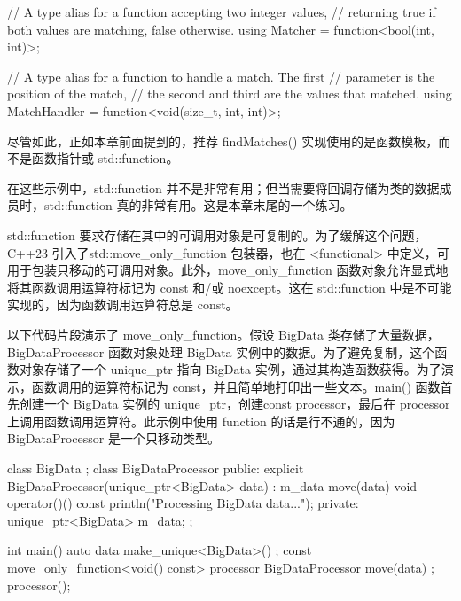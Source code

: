 \begin{cpp}
// A type alias for a function accepting two integer values,
// returning true if both values are matching, false otherwise.
using Matcher = function<bool(int, int)>;

// A type alias for a function to handle a match. The first
// parameter is the position of the match,
// the second and third are the values that matched.
using MatchHandler = function<void(size_t, int, int)>;
\end{cpp}

尽管如此，正如本章前面提到的，推荐 findMatches() 实现使用的是函数模板，而不是函数指针或 std::function。

在这些示例中，std::function 并不是非常有用；但当需要将回调存储为类的数据成员时，std::function 真的非常有用。这是本章末尾的一个练习。



std::function 要求存储在其中的可调用对象是可复制的。为了缓解这个问题，C++23 引入了std::move\_only\_function 包装器，也在 <functional> 中定义，可用于包装只移动的可调用对象。此外，move\_only\_function 函数对象允许显式地将其函数调用运算符标记为 const 和/或 noexcept。这在 std::function 中是不可能实现的，因为函数调用运算符总是 const。

以下代码片段演示了 move\_only\_function。假设 BigData 类存储了大量数据，BigDataProcessor 函数对象处理 BigData 实例中的数据。为了避免复制，这个函数对象存储了一个 unique\_ptr 指向 BigData 实例，通过其构造函数获得。为了演示，函数调用的运算符标记为 const，并且简单地打印出一些文本。main() 函数首先创建一个 BigData 实例的 unique\_ptr，创建const processor，最后在 processor 上调用函数调用运算符。此示例中使用 function 的话是行不通的，因为 BigDataProcessor 是一个只移动类型。

\begin{cpp}
class BigData {};
class BigDataProcessor
{
    public:
        explicit BigDataProcessor(unique_ptr<BigData> data)
            : m_data { move(data) } { }
        void operator()() const { println("Processing BigData data..."); }
    private:
     unique_ptr<BigData> m_data;
};

int main()
{
    auto data { make_unique<BigData>() };
    const move_only_function<void() const> processor {
        BigDataProcessor { move(data) } };
    processor();
}
\end{cpp}






























